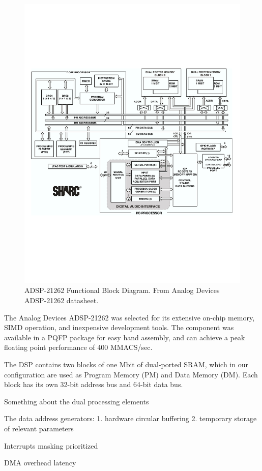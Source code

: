 \begin{figure}[h!]
\begin{center}
\includegraphics[scale=0.7]{adsp21262.pdf}
\end{center}
\caption{ADSP-21262 Functional Block Diagram. From Analog Devices ADSP-21262 datasheet.}
\label{adsp21262}
\end{figure}

The Analog Devices ADSP-21262 was selected for its extensive on-chip memory, SIMD operation, and inexpensive development tools. The component was available in a PQFP package for easy hand assembly, and can achieve a peak floating point performance of 400 MMACS/sec. 

The DSP contains two blocks of one Mbit of dual-ported SRAM, which in our configuration are used as Program Memory (PM) and Data Memory (DM). Each block has its own 32-bit address bus and 64-bit data bus. 

Something about the dual processing elements

The data address generators:
   1. hardware circular buffering
   2. temporary storage of relevant parameters

Interrupts
   masking
   prioritized

DMA
   overhead
   latency
